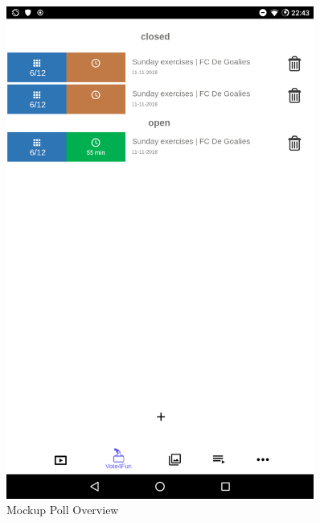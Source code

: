 \begin{appendices}
\begin{figure}[H]
    \centering
    \includegraphics[width=0.9\textwidth,keepaspectratio]{content/pictures/mockups/main-active.png}
    \caption{Mockup Poll Overview}
	\label{fig:mockup_poll_overview}
\end{figure}


\end{appendices}
